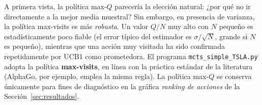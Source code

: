 A primera vista, la política max-$Q$ parecería la elección natural: ¿por qué no ir directamente a la mejor media muestral? Sin embargo, en presencia de varianza, la política max-visits es más \emph{robusta}. Un valor $Q/N$ muy alto con $N$ pequeño es estadísticamente poco fiable (el error típico del estimador es $\sigma / \sqrt{N}$, grande si $N$ es pequeño), mientras que una acción muy visitada ha sido confirmada repetidamente por UCB1 como prometedora. El programa \texttt{mcts\_simple\_TSLA.py} adopta la política \textbf{max-visits}, en línea con la práctica estándar de la literatura (AlphaGo, por ejemplo, emplea la misma regla). La política max-$Q$ se conserva únicamente para fines de diagnóstico en la gráfica \emph{ranking de acciones} de la Sección~\ref{sec:resultados}.
